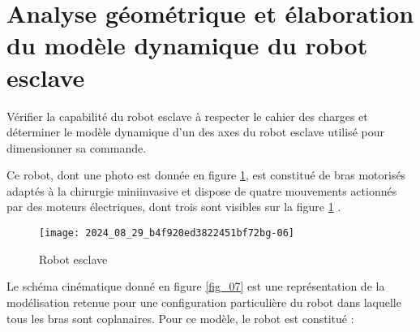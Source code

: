 \section{Analyse géométrique et élaboration du modèle dynamique du robot esclave}
\begin{obj}
Vérifier la capabilité du robot esclave à respecter le cahier des charges et déterminer le modèle dynamique d'un des axes du robot esclave utilisé pour dimensionner sa commande.
\end{obj}


\ifprof
\else
Ce robot, dont une photo est donnée en figure \ref{fig_06}, est constitué de bras motorisés adaptés à la chirurgie miniinvasive et dispose de quatre mouvements actionnés par des moteurs électriques, dont trois sont visibles sur la figure \ref{fig_06} .

\begin{figure}[!h]
\centering
\texttt{[image: 2024\_08\_29\_b4f920ed3822451bf72bg-06]}
\caption{\label{fig_06}Robot esclave}
\end{figure}

Le schéma cinématique donné en figure \ref{fig_07} est une représentation de la modélisation retenue pour une configuration particulière du robot dans laquelle tous les bras sont coplanaires. Pour ce modèle, le robot est constitué :

